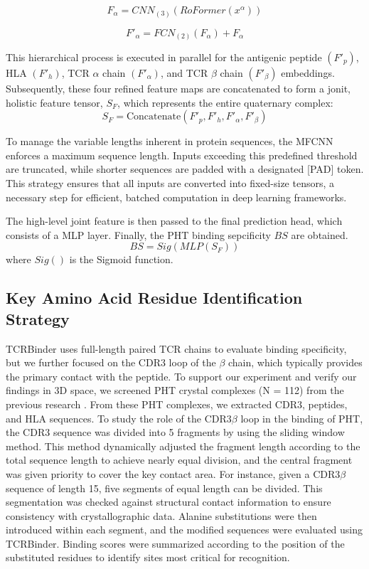 \documentclass[10pt,letterpaper]{article}
\begin{document}
\begin{equation}
F_{\alpha} = CNN_{(3)}\!( RoFormer(x^{\alpha}))
\end{equation}

\begin{equation}
F'_{\alpha} = FCN_{(2)}(F_{\alpha}) + F_{\alpha}
\end{equation}

This hierarchical process is executed in parallel for the antigenic peptide $(F'_p)$, HLA $(F'_h)$, TCR $\alpha$ chain $(F'_\alpha)$, and TCR $\beta$ chain $(F'_\beta)$ embeddings. Subsequently, these four refined feature maps are concatenated to form a jonit, holistic feature tensor, $S_F$, which represents the entire quaternary complex:
\begin{equation}
S_F = \mathrm{Concatenate}(F'_p, F'_h, F'_{\alpha}, F'_{\beta})
\end{equation}

To manage the variable lengths inherent in protein sequences, the MFCNN enforces a maximum sequence length. Inputs exceeding this predefined threshold are truncated, while shorter sequences are padded with a designated [PAD] token. This strategy ensures that all inputs are converted into fixed-size tensors, a necessary step for efficient, batched computation in deep learning frameworks.

The high-level joint feature is then passed to the final prediction head, which consists of a MLP layer. Finally, the PHT binding sepcificity $BS$ are obtained.
\begin{equation}
    BS = Sig(MLP(S_F))
\end{equation}
where $Sig()$ is the Sigmoid function.


\subsection*{Key Amino Acid Residue Identification Strategy}

TCRBinder uses full-length paired TCR chains to evaluate binding specificity, but we further focused on the CDR3 loop of the $\beta$ chain, which typically provides the primary contact with the peptide. To support our experiment and verify our findings in 3D space, we screened PHT crystal complexes (N = 112) from the previous research \cite{ref30} . From these PHT complexes, we extracted CDR3, peptides, and HLA sequences. To study the role of the CDR3$\beta$ loop in the binding of PHT, the CDR3 sequence was divided into 5 fragments by using the sliding window method. This method dynamically adjusted the fragment length according to the total sequence length to achieve nearly equal division, and the central fragment was given priority to cover the key contact area. For instance, given a CDR3$\beta$ sequence of length 15, five segments of equal length can be divided. This segmentation was checked against structural contact information to ensure consistency with crystallographic data. Alanine substitutions were then introduced within each segment, and the modified sequences were evaluated using TCRBinder. Binding scores were summarized according to the position of the substituted residues to identify sites most critical for recognition.
\end{document}
